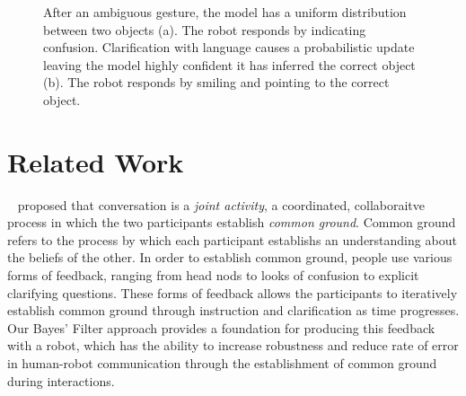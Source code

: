 \documentclass[a4paper, 11pt]{article} %
\begin{document}
\begin{figure}
\centering
{}
\caption{After an ambiguous gesture, the model has a uniform
  distribution between two objects (a).  The robot responds by
  indicating confusion.  Clarification with language causes a
  probabilistic update leaving the model highly confident it has
  inferred the correct object (b).  The robot responds by smiling and
  pointing to the correct object. \label{fig:cartoon}}
\end{figure}

\section{Related Work}
~\citep{clark96} proposed that conversation is a \textit{joint activity}, a coordinated, collaboraitve process in which the two participants establish \textit{common ground}. Common ground refers to the process by which each participant establishs an understanding about the beliefs of the other. In order to establish common ground, people use various forms of feedback, ranging from head nods to looks of confusion to explicit clarifying questions. These forms of feedback allows the participants to iteratively establish common ground through instruction and clarification as time progresses. Our Bayes' Filter approach provides a foundation for producing this feedback with a robot, which has the ability to increase robustness and reduce rate of error in human-robot communication through the establishment of common ground during interactions.
\end{document}
